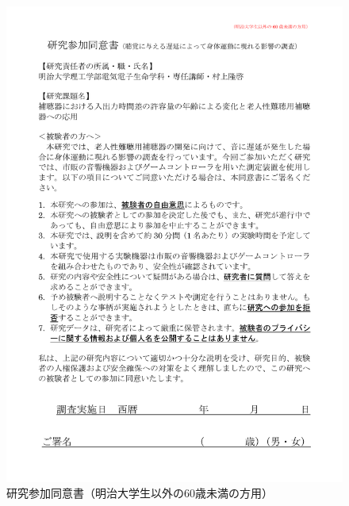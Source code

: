 \begin{figure}[ht]
  \centering
  \includegraphics[scale=0.6]{furoku_A/Douisyo_Not60NotMeiji.pdf}
  \caption{研究参加同意書（明治大学生以外の60歳未満の方用）}
\end{figure}
